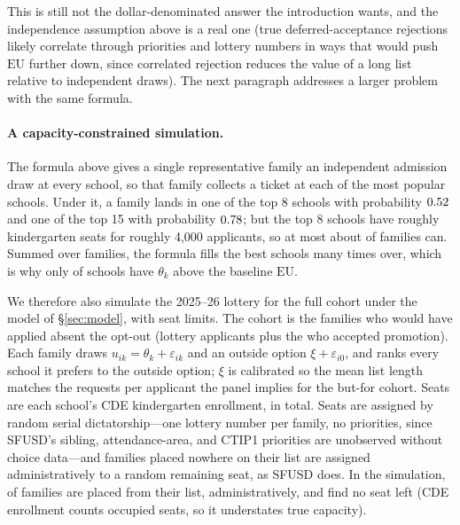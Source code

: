 \documentclass{article}
\begin{document}
This is still not the dollar-denominated answer the introduction wants, and the independence assumption above is a real one (true deferred-acceptance rejections likely correlate through priorities and lottery numbers in ways that would push $\mathrm{EU}$ further down, since correlated rejection reduces the value of a long list relative to independent draws). The next paragraph addresses a larger problem with the same formula.

\paragraph{A capacity-constrained simulation.} The formula above gives a single representative family an independent admission draw at every school, so that family collects a ticket at each of the most popular schools. Under it, a family lands in one of the top 8 schools with probability $0.52$ and one of the top 15 with probability $0.78$; but the top 8 schools have roughly \numSeatsTopEight{} kindergarten seats for roughly 4{,}000 applicants, so at most about \numSeatsTopEightShare{} of families can. Summed over families, the formula fills the best schools many times over, which is why only \numAboveEUbase{} of \numSchools{} schools have $\theta_k$ above the baseline $\mathrm{EU}$.

We therefore also simulate the 2025--26 lottery for the full cohort under the model of \S\ref{sec:model}, with seat limits. The cohort is the \numCohort{} families who would have applied absent the opt-out (lottery applicants plus the \numPromoted{} who accepted promotion). Each family draws $u_{ik} = \theta_k + \varepsilon_{ik}$ and an outside option $\xi + \varepsilon_{i0}$, and ranks every school it prefers to the outside option; $\xi$ is calibrated so the mean list length matches the \numReqPerApplicant{} requests per applicant the panel implies for the but-for cohort. Seats are each school's CDE kindergarten enrollment, \numSeats{} in total. Seats are assigned by random serial dictatorship---one lottery number per family, no priorities, since SFUSD's sibling, attendance-area, and CTIP1 priorities are unobserved without choice data---and families placed nowhere on their list are assigned administratively to a random remaining seat, as SFUSD does. In the simulation, \numSimPlaced{} of families are placed from their list, \numSimAdmin{} administratively, and \numSimNoSeat{} find no seat left (CDE enrollment counts occupied seats, so it understates true capacity).
\end{document}
